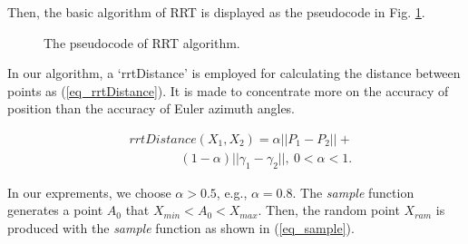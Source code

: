 \documentclass[letterpaper, 10 pt, conference]{ieeeconf}  %
\begin{document}
Then, the basic algorithm of RRT is displayed as the pseudocode in Fig. \ref{fig_rrt}.

\begin{figure}[thpb]
      \centering
      \caption{The pseudocode of RRT algorithm.}
      \label{fig_rrt}
\end{figure}

In our algorithm, a `rrtDistance' is employed for calculating the distance between points as (\ref{eq_rrtDistance}). It is made to concentrate more on the accuracy of position than the accuracy of Euler azimuth angles.

 \begin{equation}
 \begin{array}{ll}
 &rrtDistance(X_{1},X_{2})=\alpha ||P_{1}-P_{2}|| + \\
& \qquad\qquad (1-\alpha) ||\gamma_{1}-\gamma_{2}||, \ 0 < \alpha < 1.
 \end{array}
 \label{eq_rrtDistance}
 \end{equation}

 In our exprements, we choose $\alpha > 0.5$, e.g., $\alpha = 0.8$. The \textit{sample} function generates a point $A_{0}$ that $X_{min} < A_{0} < X_{max}$. Then, the random point $X_{ram}$ is produced with the \textit{sample} function as shown in  (\ref{eq_sample}).
\end{document}
